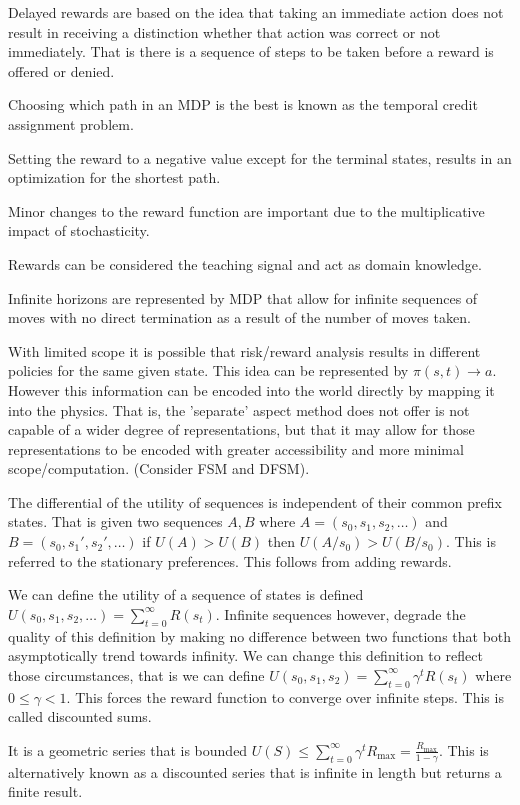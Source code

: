 \documentclass{article}
\begin{document}
Delayed rewards are based on the idea that taking an immediate action does not
result in receiving a distinction whether that action was correct or not
immediately. That is there is a sequence of steps to be taken before a reward is 
offered or denied. 

Choosing which path in an MDP is the best is known as the temporal credit
assignment problem. 

Setting the reward to a negative value except for the terminal states, results
in an optimization for the shortest path. 

Minor changes to the reward function are important due to the multiplicative
impact of stochasticity. 

Rewards can be considered the teaching signal and act as domain knowledge. 

Infinite horizons are represented by MDP that allow for infinite sequences of
moves with no direct termination as a result of the number of moves taken. 

With limited scope it is possible that risk/reward analysis results in different
policies for the same given state. This idea can be represented by $\pi(s,t)
\rightarrow a$. However this information can be encoded into the world directly
by mapping it into the physics. That is, the 'separate' aspect method does not
offer is not capable of a wider degree of representations, but that it may allow
for those representations to be encoded with greater accessibility and more 
minimal scope/computation. (Consider FSM and DFSM). 

The differential of the utility of sequences is independent of their common 
prefix states. That is given two sequences $A, B$ where $A = (s_0, s_1, s_2,
\ldots)$ and $B = (s_0, s_1', s_2', \ldots)$ if $U(A) > U(B)$ then $U(A/s_0) > 
U(B/s_0)$. This is referred to the stationary preferences. This follows from
adding rewards. 

We can define the utility of a sequence of states is defined $U(s_0, s_1, s_2,
\ldots) = \sum_{t = 0}^\infty R(s_t)$. Infinite sequences however, degrade the 
quality of this definition by making no difference between two functions that 
both asymptotically trend towards infinity. We can change this definition to 
reflect those circumstances, that is we can define $U(s_0, s_1, s_2) = 
\sum_{t = 0}^\infty \gamma^tR(s_t)$ where $0 \leq \gamma < 1$. This forces the 
reward function to converge over infinite steps. This is called discounted sums.

It is a geometric series that is bounded $U(S) \leq \sum_{t = 0}^\infty \gamma^t
R_{\text{max}} = \frac{R_{\text{max}}}{1 - \gamma}$. This is alternatively known
as a discounted series that is infinite in length but returns a finite result.
\end{document}
